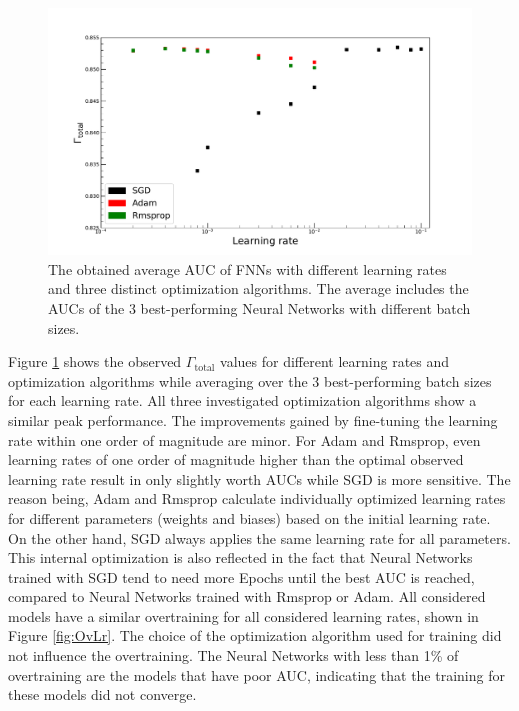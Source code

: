 \begin{figure}[H]
\centering
\includegraphics[width=\linewidth]{figs/FNN/LrAuc_All}
\caption{The obtained average AUC of FNNs with different learning rates and three distinct optimization algorithms.  The average includes the AUCs of the 3 best-performing Neural Networks with different batch sizes.}
\label{fig:LrAuc}
\end{figure}

Figure \ref{fig:LrAuc} shows the observed $\Gamma_{\text{total}}$ values for different learning rates and optimization algorithms while averaging over the 3 best-performing batch sizes for each learning rate. All three investigated optimization algorithms show a similar peak performance. The improvements gained by fine-tuning the learning rate within one order of magnitude are minor. For Adam and Rmsprop, even learning rates of one order of magnitude higher than the optimal observed learning rate result in only slightly worth AUCs while SGD is more sensitive. The reason being, Adam and Rmsprop calculate individually optimized learning rates for different parameters (weights and biases) based on the initial learning rate. On the other hand, SGD always applies the same learning rate for all parameters. This internal optimization is also reflected in the fact that Neural Networks trained with SGD tend to need more Epochs until the best AUC is reached, compared to Neural Networks trained with Rmsprop or Adam. All considered models have a similar overtraining for all considered learning rates, shown in Figure \ref{fig:OvLr}. The choice of the optimization algorithm used for training did not influence the overtraining. The Neural Networks with less than 1\% of overtraining are the models that have poor AUC, indicating that the training for these models did not converge. \\

